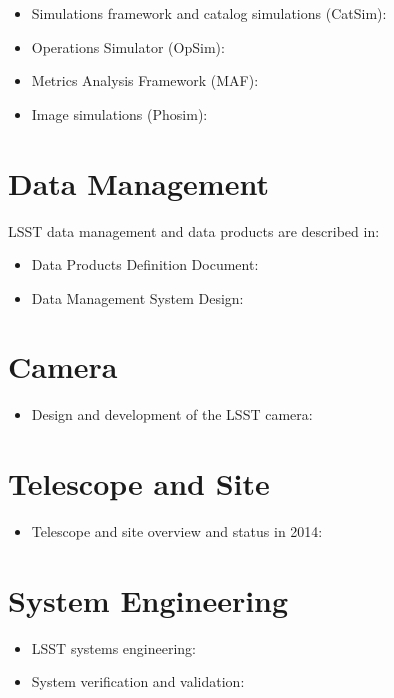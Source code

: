 \documentclass[12pt]{article}
\begin{document}
\begin{itemize}
\item Simulations framework and catalog simulations (CatSim): \cite{2014SPIE.9150E..14C}
\item Operations Simulator (OpSim): \cite{2014SPIE.9150E..15D}
\item Metrics Analysis Framework (MAF): \cite{2014SPIE.9149E..0BJ}
\item Image simulations (Phosim): \cite{0067-0049-218-1-14}
\end{itemize}


\section{Data Management}

LSST data management and data products are described in: 

\begin{itemize}
  \item Data Products Definition Document: \cite{DPDD}
  \item Data Management System Design: \cite{DMDesign}
\end{itemize}


\section{Camera}

\begin{itemize}
   \item Design and development of the LSST camera: \cite{2010SPIE.7735E..0JK}
\end{itemize}


\section{Telescope and Site}

\begin{itemize}
   \item Telescope and site overview and status in 2014:  \cite{2014SPIE.9145E..1AG}
\end{itemize}

\section{System Engineering}

\begin{itemize}
   \item LSST systems engineering: \cite{2014SPIE.9150E..0MC}
   \item System verification and validation: \cite{2014SPIE.9150E..0NS}
\end{itemize}
%



\printbibliography[heading=bibintoc]
\end{document}
